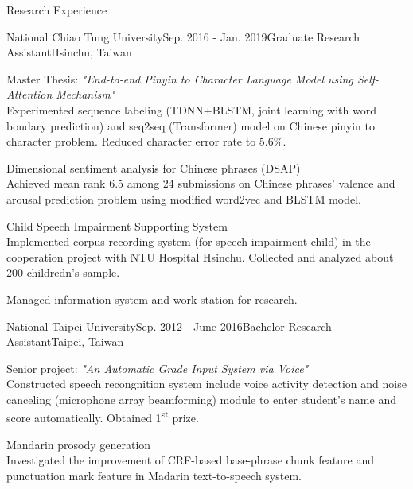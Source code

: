 \documentclass{resume} %
\newcommand{\ts}{\textsuperscript}
\begin{document}
\begin{rSection}{Research Experience}
    \begin{rSubsection}{National Chiao Tung University}{Sep. 2016 - Jan. 2019}{Graduate Research Assistant}{Hsinchu, Taiwan}
        \item Master Thesis: {\em "End-to-end Pinyin to Character Language Model using Self-Attention Mechanism"}\\
        Experimented sequence labeling (TDNN+BLSTM, joint learning with word boudary prediction) and seq2seq (Transformer) model on Chinese pinyin to character problem. Reduced character error rate to 5.6\%.
        \item Dimensional sentiment analysis for Chinese phrases (DSAP) \cite{lee2017nctu} \\
        Achieved mean rank 6.5 among 24 submissions on Chinese phrases' valence and arousal prediction problem using modified word2vec and BLSTM model.
        \item Child Speech Impairment Supporting System  \\
        Implemented corpus recording system (for speech impairment child) in the cooperation project with NTU Hospital Hsinchu. Collected and analyzed about 200 childredn's sample.
        \item Managed information system and work station for research. 
    \end{rSubsection}
    \begin{rSubsection}{National Taipei University}{Sep. 2012 - June 2016}{Bachelor Research Assistant}{Taipei, Taiwan}
        \item Senior project: {\em "An Automatic Grade Input System via Voice"}\\
        Constructed speech recongnition system include voice activity detection and noise canceling (microphone array beamforming) module to enter student's name and score automatically. Obtained 1\ts{st} prize.
        \item Mandarin prosody generation \cite{hung2014investigation}\cite{chiang2019punctuation}\\
        Investigated the improvement of CRF-based base-phrase chunk feature and punctuation mark feature in Madarin text-to-speech system.
    \end{rSubsection}
\end{rSection}
\end{document}
